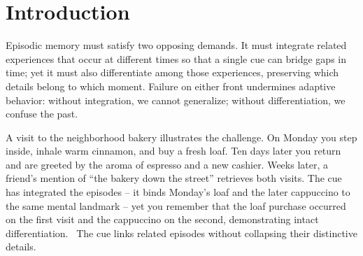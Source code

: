 \documentclass[
  letterpaper,
  11pt,
  english,
  singlespacing,
  headsepline]{MastersDoctoralThesis}
\begin{document}




% 

\begingroup
\hypersetup{linkcolor=black}

\tableofcontents %

\listoffigures %

\listoftables %

\endgroup







\mainmatter %

\pagestyle{thesis} %
\newcommand{\keyword}[1]{\textbf{#1}}
\newcommand{\tabhead}[1]{\textbf{#1}}
\newcommand{\code}[1]{\texttt{#1}}
\newcommand{\file}[1]{\texttt{\bfseries#1}}
\newcommand{\option}[1]{\texttt{\itshape#1}}



\chapter*{Introduction}\label{introduction}


Episodic memory must satisfy two opposing demands. It must integrate
related experiences that occur at different times so that a single cue
can bridge gaps in time; yet it must also differentiate among those
experiences, preserving which details belong to which moment. Failure on
either front undermines adaptive behavior: without integration, we
cannot generalize; without differentiation, we confuse the past.

A visit to the neighborhood bakery illustrates the challenge. On Monday
you step inside, inhale warm cinnamon, and buy a fresh loaf. Ten days
later you return and are greeted by the aroma of espresso and a new
cashier. Weeks later, a friend's mention of ``the bakery down the
street'' retrieves both visits. The cue has integrated the episodes --
it binds Monday's loaf and the later cappuccino to the same mental
landmark -- yet you remember that the loaf purchase occurred on the
first visit and the cappuccino on the second, demonstrating intact
differentiation.~ The cue links related episodes without collapsing
their distinctive details.
\end{document}
